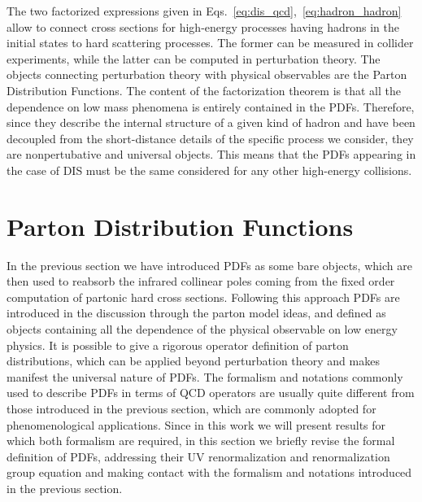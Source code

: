 %
The two factorized expressions given in Eqs.~\eqref{eq:dis_qcd},~\eqref{eq:hadron_hadron}
allow to connect cross sections for high-energy processes having hadrons in the initial states to hard scattering processes.
The former can be measured in collider experiments, while the latter 
can be computed in perturbation theory. The objects connecting perturbation theory with physical observables are
the Parton Distribution Functions.
The content of the factorization theorem is that all the dependence
on low mass phenomena is entirely contained in the PDFs. Therefore, since they describe the internal structure 
of a given kind of hadron and have been decoupled from the short-distance details of
the specific process we consider, they are nonpertubative and universal objects.
This means that the PDFs appearing in the case of DIS must be the same considered for 
any other high-energy collisions.

\section{Parton Distribution Functions}
In the previous section we have introduced PDFs as some bare objects,
which are then used to reabsorb the infrared collinear poles coming from the fixed order computation of partonic
hard cross sections. Following this approach PDFs are introduced in the discussion through 
the parton model ideas, and defined as objects containing all the dependence 
of the physical observable on low energy physics. 
%
It is possible to give a rigorous operator definition of parton distributions,
which can be applied beyond perturbation theory and makes manifest the universal nature of PDFs.
The formalism and notations commonly used to describe PDFs in terms of QCD operators are usually quite different
from those introduced in the previous section, which are commonly adopted for phenomenological applications.
Since in this work we will present results for which both formalism are required,
in this section we briefly revise the formal definition of PDFs, addressing their UV renormalization
and renormalization group equation and making contact with the formalism and notations introduced in the previous section.

